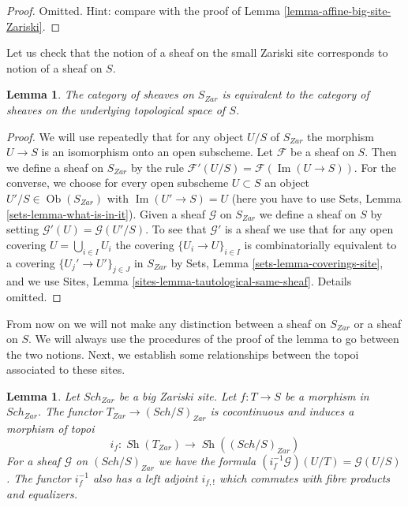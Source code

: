 \documentclass{stacks-project}
\theoremstyle{plain}
\newtheorem{lemma}[subsection]{Lemma}
\theoremstyle{definition}
\theoremstyle{remark}
\numberwithin{equation}{subsection}
\def\Sch{\mathit{Sch}}
\def\Ob{\mathop{\mathrm{Ob}}\nolimits}
\def\Sh{\mathop{\mathit{Sh}}\nolimits}
\def\Im{\mathop{\mathrm{Im}}}
\begin{document}
\begin{proof}
Omitted. Hint: compare with the proof of
Lemma \ref{lemma-affine-big-site-Zariski}.
\end{proof}

\noindent
Let us check that the notion of a sheaf on the small Zariski site
corresponds to notion of a sheaf on $S$.

\begin{lemma}
\label{lemma-Zariski-usual}
The category of sheaves on $S_{Zar}$ is equivalent to the
category of sheaves on the underlying topological space of $S$.
\end{lemma}

\begin{proof}
We will use repeatedly that for any object
$U/S$ of $S_{Zar}$ the morphism $U \to S$ is an isomorphism
onto an open subscheme.
Let $\mathcal{F}$ be a sheaf on $S$. Then we define a sheaf
on $S_{Zar}$ by the rule $\mathcal{F}'(U/S) = \mathcal{F}(\Im(U \to S))$.
For the converse, we choose for every open subscheme $U \subset S$ an object
$U'/S \in \Ob(S_{Zar})$ with $\Im(U' \to S) = U$
(here you have to use Sets, Lemma \ref{sets-lemma-what-is-in-it}).
Given a sheaf $\mathcal{G}$ on $S_{Zar}$ we define a sheaf on $S$ by setting
$\mathcal{G}'(U) = \mathcal{G}(U'/S)$. To see that $\mathcal{G}'$ is
a sheaf we use that for any open covering $U = \bigcup_{i \in I} U_i$
the covering $\{U_i \to U\}_{i \in I}$
is combinatorially equivalent to a covering $\{U_j' \to U'\}_{j \in J}$
in $S_{Zar}$ by Sets, Lemma \ref{sets-lemma-coverings-site},
and we use Sites, Lemma \ref{sites-lemma-tautological-same-sheaf}.
Details omitted.
\end{proof}

\noindent
From now on we will not make any distinction between a sheaf on
$S_{Zar}$ or a sheaf on $S$. We will always use the procedures
of the proof of the lemma to go between the two notions.
Next, we establish some relationships between the topoi
associated to these sites.

\begin{lemma}
\label{lemma-put-in-T}
Let $\Sch_{Zar}$ be a big Zariski site.
Let $f : T \to S$ be a morphism in $\Sch_{Zar}$.
The functor $T_{Zar} \to (\Sch/S)_{Zar}$
is cocontinuous and induces a morphism of topoi
$$
i_f :
\Sh(T_{Zar})
\longrightarrow
\Sh((\Sch/S)_{Zar})
$$
For a sheaf $\mathcal{G}$ on $(\Sch/S)_{Zar}$
we have the formula $(i_f^{-1}\mathcal{G})(U/T) = \mathcal{G}(U/S)$.
The functor $i_f^{-1}$ also has a left adjoint $i_{f, !}$ which commutes
with fibre products and equalizers.
\end{lemma}
\end{document}
